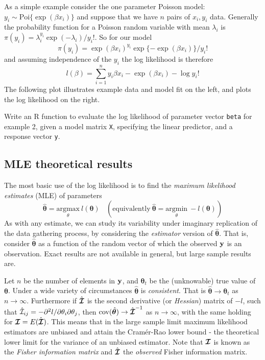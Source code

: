 \documentclass[10pt] {article}
\newcommand{\eps}[3]
{{\begin{center}
 \rotatebox{#1}{\scalebox{#2}{\texttt{[image: \#3]}}}
 \end{center}}
}
\newcommand{\ilpddif}[3]{\partial^2 #1/{\partial #2 \partial #3}}
\theoremstyle{definition}
\begin{document}
As a simple example consider the one parameter Poisson model:
$
y_i \sim \text{Poi}\{\exp(\beta x_i)\}
$ 
and suppose that we have $n$ pairs of $x_i, y_i$ data. Generally the probability function for a Poisson random variable with mean $\lambda_i$ is $\pi(y_i) = \lambda_i^{y_i} \exp(-\lambda_i)/y_i!$.  So for our model  
$$
\pi(y_i) = \exp(\beta x_i)^{y_i} \exp\{-\exp(\beta x_i)\}/y_i!
$$
and assuming independence of the $y_i$ the log likelihood is therefore
$$
l(\beta) = \sum_{i=1}^n y_i \beta x_i - \exp(\beta x_i) - \log y_i!
$$
The following plot illustrates example data and model fit on the left, and plots the log likelihood on the right. 
\eps{0}{.5}{fig-likelihood-fig-1.pdf}


\bigskip 

 Write an R function to evaluate the log likelihood of parameter vector {\tt beta} for example 2, given a model matrix {\tt X}, specifying the linear predictor, and a response vector {\tt y}.  

\subsection{MLE theoretical results}

The most basic use of the log likelihood is to find the {\em maximum likelihood estimates} (MLE) of parameters
$$
\hat {\bm \theta} = \underset{\theta}{\text{argmax}} ~l({\bm \theta}) ~~~~ (\text{equivalently}~\hat {\bm \theta} = \underset{\theta}{\text{argmin}} ~ -l({\bm \theta}))
$$
As with any estimate, we can study its variability under imaginary replication of the data gathering process, by considering the {\em estimator} version of $\hat {\bm \theta}$. That is, consider $\hat {\bm \theta}$ as a function of the random vector of which the observed $\bf y$ is an observation. Exact results are not available in general, but large sample results are. 

Let $n$ be the number of elements in $\bf y$, and ${\bm \theta}_t$ be the (unknowable) true value of $\bm \theta$. Under a wide variety of circumstances $\hat {\bm \theta}$ is {\em consistent}. That is $\hat {\bm \theta} \to {\bm \theta}_t$ as $n \to \infty$. Furthermore if $\hat{\bm{{\cal I}}}$ is the second derivative (or {\em Hessian}) matrix of $-l$, such that $\hat {\cal I}_{ij} = - \ilpddif{l}{\theta_i}{\theta_j}$, then $ \text{cov} (\hat {\bm \theta})\to  \hat{\bm{{\cal I}}}^{-1} $ as $n \to \infty$, with the same holding for ${\bm{{\cal I}}} = E(\hat {\bm{{\cal I}}})$. This means that in the large sample limit maximum likelihood estimators are unbiased and attain the Cram\'er-Rao lower bound - the theoretical lower limit for the variance of an unbiased estimator.  Note that ${\bm{{\cal I}}}$ is known as the {\em Fisher information matrix} and   $\hat{\bm{{\cal I}}}$ the {\em observed} Fisher information matrix. 
\end{document}
